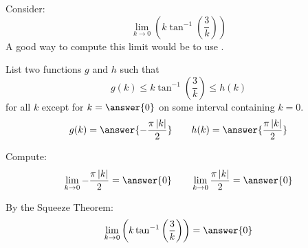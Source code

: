 \documentclass{ximera}
\author{Bart Snapp}
\begin{document}
\begin{exercise}


Consider:
\[
\lim_{k\to 0} \left(k \tan ^{-1}\left(\frac{3}{k}\right)\right)
\]
A good way to compute this limit would be to use .
\begin{exercise}
List two functions $g$ and $h$ such that
\[
g(k)\le k \tan ^{-1}\left(\frac{3}{k}\right) \le h(k)
\]
for all $k$ except for $k=\answer{0}$ on some interval containing $k=0$.
\[
g(k)=\answer{-\frac{\pi  \left| k\right| }{2}}\qquad h(k) =\answer{\frac{\pi  \left| k\right| }{2}}
\]
\begin{exercise}
Compute:
\[
\lim_{k \to 0}-\frac{\pi  \left| k\right| }{2} = \answer{0}\qquad \lim_{k\to 0}\frac{\pi  \left| k\right| }{2} = \answer{0}
\]
\begin{exercise}
By the Squeeze Theorem:
\[
\lim_{k\to 0} \left(k \tan ^{-1}\left(\frac{3}{k}\right)\right) = \answer{0}
\]
\end{exercise}
\end{exercise}
\end{exercise}
\end{exercise}
\end{document}
